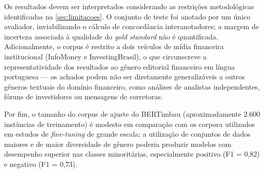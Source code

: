Os resultados devem ser interpretados considerando as restrições metodológicas identificadas na \autoref{sec:limitacoes}. O conjunto de teste foi anotado por um único avaliador, inviabilizando o cálculo de concordância interanotadores; a margem de incerteza associada à qualidade do \textit{gold standard} não é quantificada. Adicionalmente, o corpus é restrito a dois veículos de mídia financeira institucional (InfoMoney e InvestingBrasil), o que circunscreve a representatividade dos resultados ao gênero editorial financeiro em língua portuguesa --- os achados podem não ser diretamente generalizáveis a outros gêneros textuais do domínio financeiro, como análises de analistas independentes, fóruns de investidores ou mensagens de corretoras.

Por fim, o tamanho do corpus de ajuste do BERTimbau (aproximadamente 2.600 instâncias de treinamento) é modesto em comparação com os corpora utilizados em estudos de \textit{fine-tuning} de grande escala; a utilização de conjuntos de dados maiores e de maior diversidade de gênero poderia produzir modelos com desempenho superior nas classes minoritárias, especialmente positivo (F1 = 0,82) e negativo (F1 = 0,73).